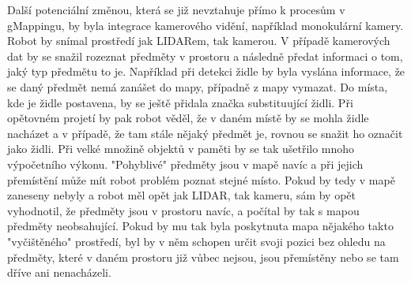 \documentclass[12pt]{report}
\begin{document}
\indent Další potenciální změnou, která se již nevztahuje přímo k procesům v gMappingu, by byla integrace kamerového vidění, například monokulární kamery. Robot by snímal prostředí jak LIDARem, tak kamerou. V případě kamerových dat by se snažil rozeznat předměty v prostoru a následně předat informaci o tom, jaký typ předmětu to je. Například při detekci židle by byla vyslána informace, že se daný předmět nemá zanášet do mapy, případně z mapy vymazat. Do místa, kde je židle postavena, by se ještě přidala značka substituující židli. Při opětovném projetí by pak robot věděl, že v daném místě by se mohla židle nacházet a v případě, že tam stále nějaký předmět je, rovnou se snažit ho označit jako židli. Při velké množině objektů v paměti by se tak ušetřilo mnoho výpočetního výkonu. "Pohyblivé" předměty jsou v mapě navíc a při jejich přemístění může mít robot problém poznat stejné místo. Pokud by tedy v mapě zaneseny nebyly a robot měl opět jak LIDAR, tak kameru, sám by opět vyhodnotil, že předměty jsou v prostoru navíc, a počítal by tak s mapou předměty neobsahující. Pokud by mu tak byla poskytnuta mapa nějakého takto "vyčištěného" prostředí, byl by v něm schopen určit svoji pozici bez ohledu na předměty, které v daném prostoru již vůbec nejsou, jsou přemístěny nebo se tam dříve ani nenacházeli.

\newpage
\end{document}
